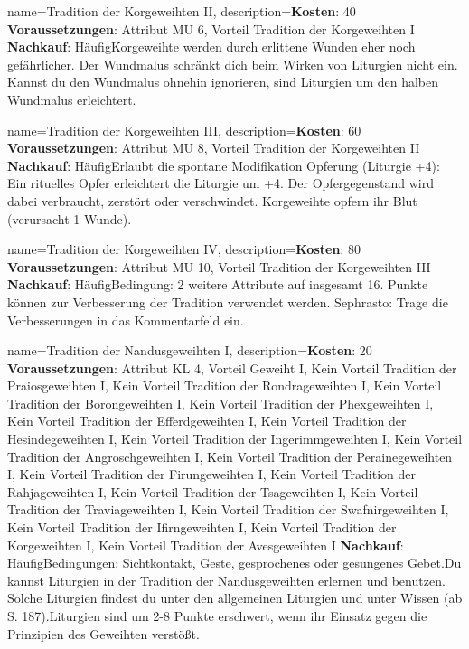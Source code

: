 {
    name={Tradition der Korgeweihten II},
    description={\textbf{Kosten}: 40 \textbf{Voraussetzungen}: Attribut MU 6, Vorteil Tradition der Korgeweihten I \textbf{Nachkauf}: Häufig\newline Korgeweihte werden durch erlittene Wunden eher noch gefährlicher. Der Wundmalus schränkt dich beim Wirken von Liturgien nicht ein. Kannst du den Wundmalus ohnehin ignorieren, sind Liturgien um den halben Wundmalus erleichtert.}
}


{
    name={Tradition der Korgeweihten III},
    description={\textbf{Kosten}: 60 \textbf{Voraussetzungen}: Attribut MU 8, Vorteil Tradition der Korgeweihten II \textbf{Nachkauf}: Häufig\newline Erlaubt die spontane Modifikation Opferung (Liturgie +4): Ein rituelles Opfer erleichtert die Liturgie um +4. Der Opfergegenstand wird dabei verbraucht, zerstört oder verschwindet. Korgeweihte opfern ihr Blut (verursacht 1 Wunde).}
}


{
    name={Tradition der Korgeweihten IV},
    description={\textbf{Kosten}: 80 \textbf{Voraussetzungen}: Attribut MU 10, Vorteil Tradition der Korgeweihten III \textbf{Nachkauf}: Häufig\newline Bedingung: 2 weitere Attribute auf insgesamt 16. Punkte können zur Verbesserung der Tradition verwendet werden. Sephrasto: Trage die Verbesserungen in das Kommentarfeld ein.}
}


{
    name={Tradition der Nandusgeweihten I},
    description={\textbf{Kosten}: 20 \textbf{Voraussetzungen}: Attribut KL 4, Vorteil Geweiht I, Kein Vorteil Tradition der Praiosgeweihten I, Kein Vorteil Tradition der Rondrageweihten I, Kein Vorteil Tradition der Borongeweihten I, Kein Vorteil Tradition der Phexgeweihten I, Kein Vorteil Tradition der Efferdgeweihten I, Kein Vorteil Tradition der Hesindegeweihten I, Kein Vorteil Tradition der Ingerimmgeweihten I, Kein Vorteil Tradition der Angroschgeweihten I, Kein Vorteil Tradition der Perainegeweihten I, Kein Vorteil Tradition der Firungeweihten I, Kein Vorteil Tradition der Rahjageweihten I, Kein Vorteil Tradition der Tsageweihten I, Kein Vorteil Tradition der Traviageweihten I, Kein Vorteil Tradition der Swafnirgeweihten I, Kein Vorteil Tradition der Ifirngeweihten I, Kein Vorteil Tradition der Korgeweihten I, Kein Vorteil Tradition der Avesgeweihten I \textbf{Nachkauf}: Häufig\newline Bedingungen: Sichtkontakt, Geste, gesprochenes oder gesungenes Gebet.\newline Du kannst Liturgien in der Tradition der Nandusgeweihten erlernen und benutzen. Solche Liturgien findest du unter den allgemeinen Liturgien und unter Wissen (ab S. 187).\newline Liturgien sind um 2-8 Punkte erschwert, wenn ihr Einsatz gegen die Prinzipien des Geweihten verstößt.}
}


